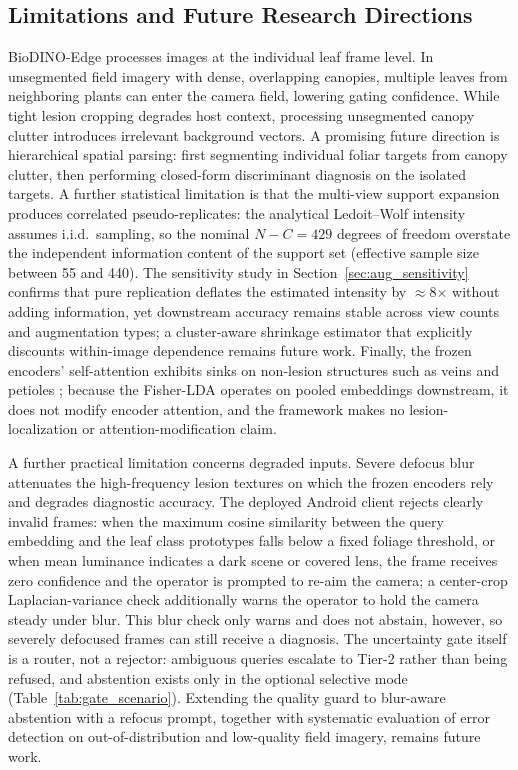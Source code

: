 \documentclass[preprint,12pt]{elsarticle}
\begin{document}
\subsection{Limitations and Future Research Directions}
BioDINO-Edge processes images at the individual leaf frame level. In unsegmented field imagery with dense, overlapping canopies, multiple leaves from neighboring plants can enter the camera field, lowering gating confidence. While tight lesion cropping degrades host context, processing unsegmented canopy clutter introduces irrelevant background vectors. A promising future direction is hierarchical spatial parsing: first segmenting individual foliar targets from canopy clutter, then performing closed-form discriminant diagnosis on the isolated targets. A further statistical limitation is that the multi-view support expansion produces correlated pseudo-replicates: the analytical Ledoit--Wolf intensity assumes i.i.d.\ sampling, so the nominal $N-C=429$ degrees of freedom overstate the independent information content of the support set (effective sample size between 55 and 440). The sensitivity study in Section~\ref{sec:aug_sensitivity} confirms that pure replication deflates the estimated intensity by $\approx$8$\times$ without adding information, yet downstream accuracy remains stable across view counts and augmentation types; a cluster-aware shrinkage estimator that explicitly discounts within-image dependence remains future work. Finally, the frozen encoders' self-attention exhibits sinks on non-lesion structures such as veins and petioles \cite{darcet2024vision}; because the Fisher-LDA operates on pooled embeddings downstream, it does not modify encoder attention, and the framework makes no lesion-localization or attention-modification claim.

A further practical limitation concerns degraded inputs. Severe defocus blur attenuates the high-frequency lesion textures on which the frozen encoders rely and degrades diagnostic accuracy. The deployed Android client rejects clearly invalid frames: when the maximum cosine similarity between the query embedding and the leaf class prototypes falls below a fixed foliage threshold, or when mean luminance indicates a dark scene or covered lens, the frame receives zero confidence and the operator is prompted to re-aim the camera; a center-crop Laplacian-variance check additionally warns the operator to hold the camera steady under blur. This blur check only warns and does not abstain, however, so severely defocused frames can still receive a diagnosis. The uncertainty gate itself is a router, not a rejector: ambiguous queries escalate to Tier-2 rather than being refused, and abstention exists only in the optional selective mode (Table~\ref{tab:gate_scenario}). Extending the quality guard to blur-aware abstention with a refocus prompt, together with systematic evaluation of error detection on out-of-distribution and low-quality field imagery, remains future work.
\end{document}
